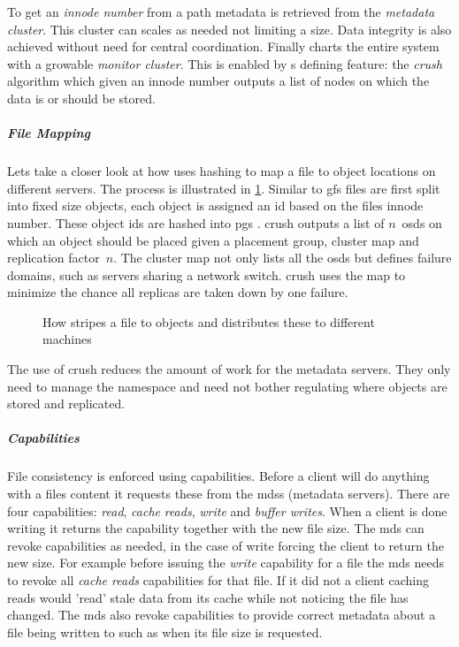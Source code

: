To get an \textit{innode number} from a path metadata is retrieved from the \textit{metadata cluster}. This cluster can scales as needed not limiting a \ceph{} size. Data integrity is also achieved without need for central coordination. Finally \ceph{} charts the entire system with a growable \textit{monitor cluster}. This is enabled by \ceph{}s defining feature: the \emph{\ac{crush}} algorithm which given an innode number outputs a list of nodes on which the data is or should be stored.

\subparagraph{File Mapping}
Lets take a closer look at how \ceph{} uses hashing to map a file to object locations on different servers. The process is illustrated in \cref{fig:ceph_crush}. Similar to \ac{gfs} files are first split into fixed size objects, each object is assigned an id based on the files innode number. These object ids are hashed into \acp{pg} . \ac{crush} outputs a list of $n$~\acp{osd} on which an object should be placed given a placement group, cluster map and replication factor~$n$. The cluster map not only lists all the \acp{osd} but defines failure domains, such as servers sharing a network switch. \ac{crush} uses the map to minimize the chance all replicas are taken down by one failure.

\begin{figure}[htbp]
	\centering
	
	\caption{How \ceph{} stripes a file to objects and distributes these to different machines}
	\label{fig:ceph_crush}
\end{figure}

The use of \ac{crush} reduces the amount of work for the metadata servers. They only need to manage the namespace and need not bother regulating where objects are stored and replicated.

\subparagraph{Capabilities}
File consistency is enforced using capabilities. Before a client will do anything with a files content it requests these from the \acp{mds} (metadata servers). There are four capabilities: \textit{read}, \textit{cache} \textit{reads}, \textit{write} and \textit{buffer writes}. When a client is done writing it returns the capability together with the new file size. The \ac{mds} can revoke capabilities as needed, in the case of write forcing the client to return the new size. For example before issuing the \textit{write} capability for a file the \ac{mds} needs to revoke all \textit{cache reads} capabilities for that file. If it did not a client caching reads would 'read' stale data from its cache while not noticing the file has changed. The \ac{mds} also revoke capabilities to provide correct metadata about a file being written to such as when its file size is requested.

